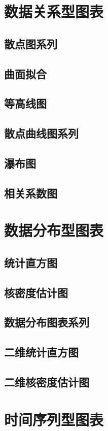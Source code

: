 \documentclass[openany]{progbookcn}
\begin{document}
\section{数据关系型图表}
\subsection{散点图系列}
\subsection{曲面拟合}
\subsection{等高线图}
\subsection{散点曲线图系列}
\subsection{瀑布图}
\subsection{相关系数图}

\section{数据分布型图表}
\subsection{统计直方图}
\subsection{核密度估计图}
\subsection{数据分布图表系列}
\subsection{二维统计直方图}
\subsection{二维核密度估计图}

\section{时间序列型图表}
\end{document}
